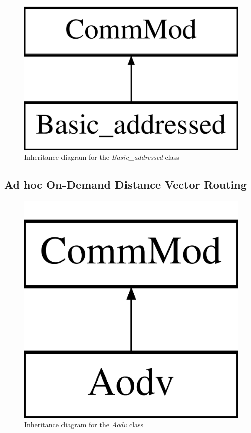 \begin{figure}
\centering
\includegraphics[scale=0.2]{../documentation/latex/class_basic__addressed}	
\caption{Inheritance diagram for the \textit{Basic\_addressed} class}
\end{figure}	
	
	\subsection{Ad hoc On-Demand Distance Vector Routing}

\begin{figure}
\centering	
\includegraphics[scale=0.2]{../documentation/latex/class_aodv}	
\caption{Inheritance diagram for the \textit{Aodv} class}
\end{figure}